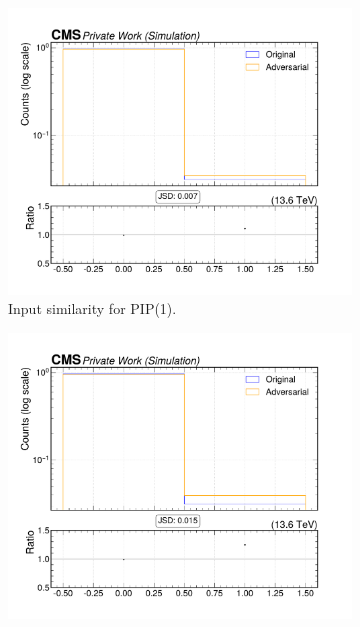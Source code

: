 \begin{figure}[htbp]
  \centering
  \begin{subfigure}[t]{0.32\textwidth}
    \includegraphics[width=\linewidth]{media/output/features/compare/intprob_1/cmp_npf_arr_Npfcan_HadFrac.pdf}
    \caption{Input similarity for PIP(1).}
  \end{subfigure}\hfill
  \begin{subfigure}[t]{0.32\textwidth}
    \includegraphics[width=\linewidth]{media/output/features/compare/intprob_2/cmp_npf_arr_Npfcan_HadFrac.pdf}

\end{subfigure}
\end{figure}
